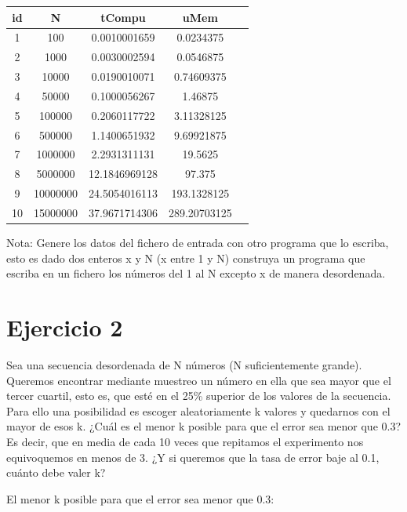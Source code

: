 \documentclass{uimppracticas}
\begin{document}
\begin{center}
	\begin{tabular}{ |c|c|c|c|c| } 
		\hline
		id & N & tCompu & uMem \\
		\hline
		1 &  100 &      0.0010001659 &    0.0234375 \\ 
		2 &  1000 &     0.0030002594 &    0.0546875 \\
		3 &  10000 &    0.0190010071 &    0.74609375 \\ 
		4 &  50000 &    0.1000056267 &    1.46875 \\ 
		5 &  100000 &   0.2060117722 &    3.11328125 \\ 
		6 &  500000 &   1.1400651932 &    9.69921875 \\ 
		7 &  1000000 &  2.2931311131 &   19.5625 \\ 
		8 &  5000000 &  12.1846969128 &  97.375 \\ 
		9 &  10000000 & 24.5054016113 & 193.1328125 \\ 
		10 & 15000000 & 37.9671714306 & 289.20703125 \\ 
		\hline
	\end{tabular}
\end{center}

Nota: Genere los datos del fichero de entrada con otro programa que lo escriba, esto es dado dos enteros x y N (x entre 1 y N) construya un programa que escriba en un fichero los números del 1 al N excepto x de manera desordenada.



\section{Ejercicio 2}

Sea una secuencia desordenada de N números (N suficientemente grande). Queremos encontrar mediante muestreo un número en ella que sea mayor que el tercer cuartil, esto es, que esté en el 25\% superior de los valores de la secuencia. Para ello una posibilidad es escoger aleatoriamente k valores y quedarnos con el mayor de esos k. ¿Cuál es el menor k posible para que el error sea menor que 0.3? Es decir, que en media de cada 10 veces que repitamos el experimento nos equivoquemos en menos de 3. ¿Y si queremos que la tasa de error baje al 0.1, cuánto debe valer k? 

El menor k posible para que el error sea menor que 0.3:
\end{document}
